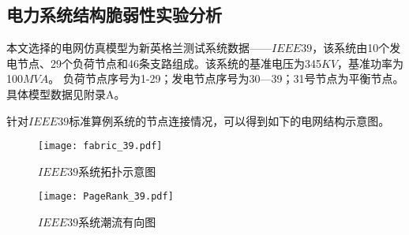 \subsection{电力系统结构脆弱性实验分析}
\label{sec:singleAnalysis_fabric}
本文选择的电网仿真模型为新英格兰测试系统数据——$IEEE39$，该系统由10个发电节点、29个负荷节点和46条支路组成。该系统的基准电压为345$KV$，基准功率为100$MVA$。
负荷节点序号为1-29；发电节点序号为30—39；31号节点为平衡节点。具体模型数据见附录A。

针对$IEEE39$标准算例系统的节点连接情况，可以得到如下的电网结构示意图。
\begin{figure}[H] %
  \centering
  \texttt{[image: fabric\_39.pdf]}
  \caption{$IEEE39$系统拓扑示意图}
  \label{fig:fabric_39}
\end{figure}

\begin{figure}[H] %
  \centering
  \texttt{[image: PageRank\_39.pdf]}
  \caption{$IEEE39$系统潮流有向图}
  \label{fig:PageRank_39}
\end{figure}


